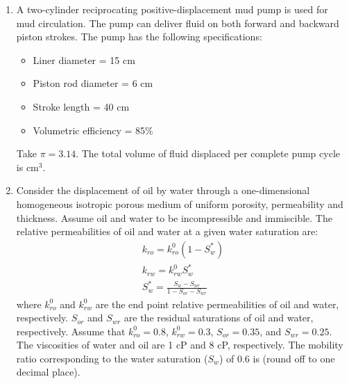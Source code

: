 \documentclass[journal,12pt,onecolumn]{IEEEtran}
\theoremstyle{remark}
\begin{document}
\begin{enumerate}
\item  A two-cylinder reciprocating positive-displacement mud pump is used for mud circulation. The pump can deliver fluid on both forward and backward piston strokes. The pump has the following specifications:
\begin{itemize}
\item Liner diameter = 15 cm
\item Piston rod diameter = 6 cm
\item Stroke length = 40 cm
\item Volumetric efficiency = 85\%
\end{itemize}
Take $\pi = 3.14$. The total volume of fluid displaced per complete pump cycle is \underline{\hspace{1cm}} cm$^3$.
\begin{enumerate}
\end{enumerate}
\hfill{}



\item  Consider the displacement of oil by water through a one-dimensional homogeneous isotropic porous medium of uniform porosity, permeability and thickness. Assume oil and water to be incompressible and immiscible. The relative permeabilities of oil  and water  at a given water saturation  are:
\begin{align}
 k_{ro} = k_{ro}^0 (1 - S_w^*)\\
 k_{rw} = k_{rw}^0 S_w^*\\
 S_w^* = \frac{S_w - S_{wr}}{1 - S_{or} - S_{wr}}
\end{align}
where $k_{ro}^0$ and $k_{rw}^0$ are the end point relative permeabilities of oil and water, respectively. $S_{or}$ and $S_{wr}$ are the residual saturations of oil and water, respectively. Assume that $k_{ro}^0 = 0.8$, $k_{rw}^0 = 0.3$, $S_{or} = 0.35$, and $S_{wr} = 0.25$. The viscosities of water and oil are 1 cP and 8 cP, respectively. The mobility ratio corresponding to the water saturation ($S_w$) of 0.6 is \underline{\hspace{1cm}} (round off to one decimal place).
\begin{enumerate}
\end{enumerate}
\hfill{}




\end{enumerate}
\end{document}
